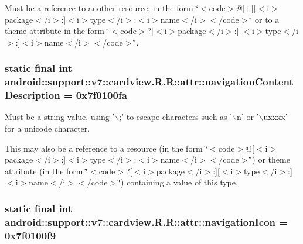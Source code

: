 Must be a reference to another resource, in the form \char`\"{}$<$code$>$@\mbox{[}+\mbox{]}\mbox{[}$<$i$>$package$<$/i$>$:\mbox{]}$<$i$>$type$<$/i$>$:$<$i$>$name$<$/i$>$$<$/code$>$\char`\"{} or to a theme attribute in the form \char`\"{}$<$code$>$?\mbox{[}$<$i$>$package$<$/i$>$:\mbox{]}\mbox{[}$<$i$>$type$<$/i$>$:\mbox{]}$<$i$>$name$<$/i$>$$<$/code$>$\char`\"{}. \hypertarget{classandroid_1_1support_1_1v7_1_1cardview_1_1_r_1_1attr_7b959fbf11ec4cc41578442621962b1e}{
\subsubsection[{navigationContentDescription}]{\setlength{\rightskip}{0pt plus 5cm}static final int android::support::v7::cardview.R.R::attr::navigationContentDescription = 0x7f0100fa}}
\label{classandroid_1_1support_1_1v7_1_1cardview_1_1_r_1_1attr_7b959fbf11ec4cc41578442621962b1e}


Must be a \hyperlink{classandroid_1_1support_1_1v7_1_1cardview_1_1_r_1_1string}{string} value, using '$\backslash$;' to escape characters such as '$\backslash$n' or '$\backslash$uxxxx' for a unicode character. 

This may also be a reference to a resource (in the form \char`\"{}$<$code$>$@\mbox{[}$<$i$>$package$<$/i$>$:\mbox{]}$<$i$>$type$<$/i$>$:$<$i$>$name$<$/i$>$$<$/code$>$\char`\"{}) or theme attribute (in the form \char`\"{}$<$code$>$?\mbox{[}$<$i$>$package$<$/i$>$:\mbox{]}\mbox{[}$<$i$>$type$<$/i$>$:\mbox{]}$<$i$>$name$<$/i$>$$<$/code$>$\char`\"{}) containing a value of this type. \hypertarget{classandroid_1_1support_1_1v7_1_1cardview_1_1_r_1_1attr_4d531884caccdf69708dee617c267a1c}{
\subsubsection[{navigationIcon}]{\setlength{\rightskip}{0pt plus 5cm}static final int android::support::v7::cardview.R.R::attr::navigationIcon = 0x7f0100f9}}
\label{classandroid_1_1support_1_1v7_1_1cardview_1_1_r_1_1attr_4d531884caccdf69708dee617c267a1c}


